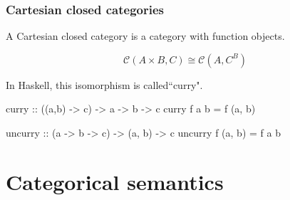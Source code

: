 \documentclass[
xcolor={usenames,dvipsnames,svgnames},
]{beamer}
\begin{document}

  \begin{frame}[fragile]
    \frametitle{Cartesian closed categories}
    A Cartesian closed category is a category with function objects.

    \[
    \mathcal{C}(A \times B, C) \cong \mathcal{C}(A, C^B)
    \]

    In Haskell, this isomorphism is called``curry".

    \begin{code}
      curry :: ((a,b) -> c) -> a -> b -> c
      curry f a b = f (a, b)

      uncurry :: (a -> b -> c) -> (a, b) -> c
      uncurry f (a, b) = f a b
    \end{code}

  \end{frame}


  \section{Categorical semantics}
\end{document}
